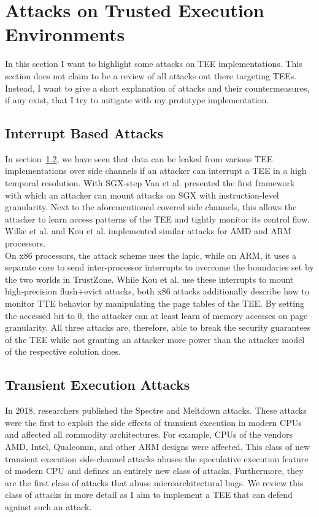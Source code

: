 \section{Attacks on Trusted Execution Environments}
\label{sec:20:attacks}
In this section I want to highlight some attacks on TEE implementations. This
section does not claim to be a review of all attacks out there targeting TEEs.
Instead, I want to give a short explanation of attacks and their
countermeasures, if any exist, that I try to mitigate with my prototype
implementation.

\subsection{Interrupt Based Attacks}
\label{sec:20:interrupt_sca}
In section~\ref{sec:20:transientattacks}, we have seen that data can be leaked
from various TEE implementations over side channels if an attacker can interrupt
a TEE in a high temporal resolution. With SGX-step Van et al. presented the
first framework with which an attacker can mount attacks on SGX with
instruction-level granularity.\cite{van2017sgx} Next to the aforementioned
covered side channels, this allows the attacker to learn access patterns of the
TEE and tightly monitor its control flow. Wilke et al. and Kou et al.
implemented similar attacks for AMD and ARM processors.\cite{wilke2023sev,
    kou2021load}\\

On x86 processors, the attack scheme uses the \gls{lapic}, while on ARM, it uses
a separate core to send inter-processor interrupts to overcome the boundaries
set by the two worlds in TrustZone. While Kou et al. use these interrupts to
mount high-precision flush+evict attacks, both x86 attacks additionally describe
how to monitor TTE behavior by manipulating the page tables of the TEE. By
setting the accessed bit to 0, the attacker can at least learn of memory
accesses on page granularity. All three attacks are, therefore, able to break
the security guarantees of the TEE while not granting an attacker more power
than the attacker model of the respective solution does.

\subsection{Transient Execution Attacks}
\label{sec:20:transientattacks}
In 2018, researchers published the Spectre and Meltdown
attacks.\cite{kocher_spectre_2020, lipp_meltdown_2020} These attacks were the
first to exploit the side effects of transient execution in modern CPUs and
affected all commodity architectures. For example, CPUs of the vendors AMD,
Intel, Qualcomm, and other ARM designs were affected. This class of new
transient execution side-channel attacks abuses the speculative execution
feature of modern CPU and defines an entirely new class of attacks. Furthermore,
they are the first class of attacks that abuse microarchitectural bugs. We
review this class of attacks in more detail as I aim to implement a TEE that
can defend against such an attack.\\

